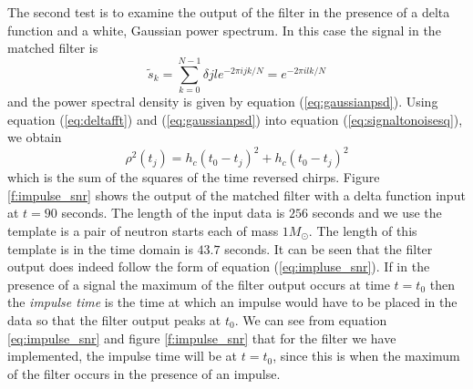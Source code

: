 The second test is to examine the output of the filter in the presence of a
delta function and a white, Gaussian power spectrum. In this case the signal
in the matched filter is
\begin{equation}
\tilde{s}_k = \sum_{k=0}^{N-1} \delta{jl} e^{-2\pi ijk/N} = e^{-2\pi ilk/N}
\label{eq:deltafft}
\end{equation}
and the power spectral density is given by equation (\ref{eq:gaussianpsd}).
Using equation (\ref{eq:deltafft}) and (\ref{eq:gaussianpsd}) into equation
(\ref{eq:signaltonoisesq}), we obtain
\begin{equation}
\rho^2(t_j) = h_c(t_0 - t_j)^2 + h_c(t_0 - t_j)^2
\label{eq:impulse_snr}
\end{equation}
which is the sum of the squares of the time reversed chirps.  Figure
\ref{f:impulse_snr} shows the output of the matched filter with a delta
function input at $t=90$ seconds. The length of the input data is $256$
seconds and we use the template is a pair of neutron starts each of
mass $1 M_\odot$. The length of this template is in the time domain is $43.7$
seconds.  It can be seen that the filter output does indeed follow the form of
equation (\ref{eq:impluse_snr}). If in the presence of a signal
the maximum of the filter output occurs at time $t = t_0$ then the
\emph{impulse time} is the time at which an impulse would have to be placed in
the data so that the filter output peaks at $t_0$. We can see from equation
\ref{eq:impulse_snr} and figure \ref{f:impulse_snr} that for the filter we
have implemented, the impulse time will be at $t = t_0$, since this is when
the maximum of the filter occurs in the presence of an impulse.
